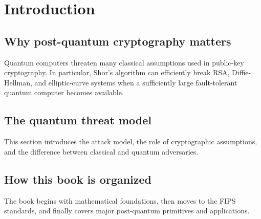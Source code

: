 \chapter{Introduction}
\section{Why post-quantum cryptography matters}
Quantum computers threaten many classical assumptions used in public-key cryptography. In particular, Shor's algorithm can efficiently break RSA, Diffie-Hellman, and elliptic-curve systems when a sufficiently large fault-tolerant quantum computer becomes available.

\section{The quantum threat model}
This section introduces the attack model, the role of cryptographic assumptions, and the difference between classical and quantum adversaries.

\section{How this book is organized}
The book begins with mathematical foundations, then moves to the FIPS standards, and finally covers major post-quantum primitives and applications.

